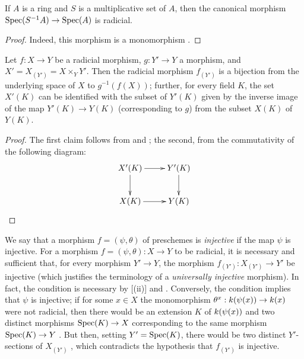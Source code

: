 \begin{cor}[3.5.9]
\label{1.3.5.9}
If $A$ is a ring and $S$ is a multiplicative set of $A$, then the canonical morphism $\Spec(S^{-1}A)\to\Spec(A)$ is radicial.
\end{cor}

\begin{proof}
\label{proof-1.3.5.9}
Indeed, this morphism is a monomorphism .
\end{proof}

\begin{cor}[3.5.10]
\label{1.3.5.10}
Let $f:X\to Y$ be a radicial morphism, $g:Y'\to Y$ a morphism, and $X'=X_{(Y')}=X\times_Y Y'$.
Then the radicial morphism $f_{(Y')}$  is a bijection from the underlying space of $X$ to $g^{-1}(f(X))$; further, for every field $K$, the set $X'(K)$ can be identified with the subset of $Y'(K)$ given by the inverse image of the map $Y'(K)\to Y(K)$ (corresponding to $g$) from the subset $X(K)$ of $Y(K)$.
\end{cor}

\begin{proof}
\label{proof-1.3.5.10}
The first claim follows from  and ; the second, from the commutativity of the following diagram:
\[
  \xymatrix{
    X'(K)\ar[r]\ar[d] &
    Y'(K)\ar[d]\\
    X(K)\ar[r] &
    Y(K)
  }
\]
\end{proof}

\begin{rmk}[3.5.11]
\label{1.3.5.11}
We say that a morphism $f=(\psi,\theta)$ of preschemes is \emph{injective} if the map $\psi$ is injective.
For a morphism $f=(\psi,\theta):X\to Y$ to be radicial, it is necessary and sufficient that, for every morphism $Y'\to Y$, the morphism $f_{(Y')}:X_{(Y')}\to Y'$ be injective (which justifies the terminology of a \emph{universally injective} morphism).
In fact, the condition is necessary by [(ii)] and .
Conversely, the condition implies that $\psi$ is injective; if for some $x\in X$ the monomorphism $\theta^x:\kres(\psi(x))\to\kres(x)$ were not radicial, then there would be an extension $K$ of $k(\psi(x))$ and two distinct morphisms $\Spec(K)\to X$ corresponding to the same morphism $\Spec(K)\to Y$ .
But then, setting $Y'={\mathop{\mathrm{Spec}}\nolimits}(K)$, there would be two distinct $Y'$-sections of $X_{(Y')}$ , which contradicts the hypothesis that $f_{(Y')}$ is injective.
\end{rmk}

